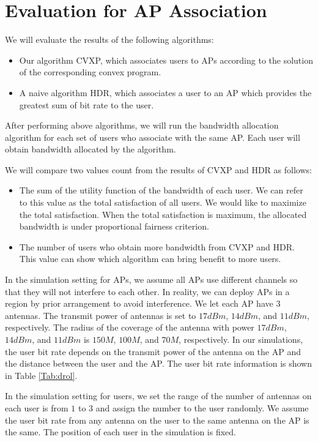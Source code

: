 \section{Evaluation for AP Association}
	We will evaluate the results of the following algorithms:
	\begin{itemize}
		\item Our algorithm CVXP, which associates users to APs according to the solution of the corresponding convex program.
		\item A naive algorithm HDR, which associates a user to an AP which provides the greatest sum of bit rate to the user.
	\end{itemize}
	After performing above algorithms, we will run the bandwidth allocation algorithm for each set of users who associate with the same AP. Each user will obtain bandwidth allocated by the algorithm.

	We will compare two values count from the results of CVXP and HDR as follows:
	\begin{itemize}
		\item The sum of the utility function of the bandwidth of each user. We can refer to this value as the total satisfaction of all users. We would like to maximize the total satisfaction. When the total satisfaction is maximum, the allocated bandwidth is under proportional fairness criterion.
		\item The number of users who obtain more bandwidth from CVXP and HDR. This value can show which algorithm can bring benefit to more users.
	\end{itemize}

	In the simulation setting for APs, we assume all APs use different channels so that they will not interfere to each other. In reality, we can deploy APs in a region by prior arrangement to avoid interference. We let each AP have $3$ antennas. The transmit power of antennas is set to $17 dBm$, $14 dBm$, and $11 dBm$, respectively. The radius of the coverage of the antenna with power $17 dBm$, $14 dBm$, and $11 dBm$ is $150 M$, $100 M$, and $70 M$, respectively. In our simulations, the user bit rate depends on the transmit power of the antenna on the AP and the distance between the user and the AP. The user bit rate information is shown in Table \ref{Tab:drol}.

	In the simulation setting for users, we set the range of the number of antennas on each user is from $1$ to $3$ and assign the number to the user randomly. We assume the user bit rate from any antenna on the user to the same antenna on the AP is the same. The position of each user in the simulation is fixed.

